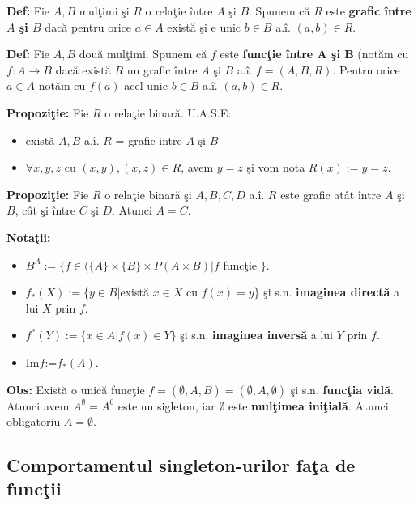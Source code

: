 \documentclass{article}
\begin{document}
\textbf{Def:} Fie $A,B$ mul\c timi \c si $R$ o rela\c tie \^ intre $A$ \c si $B$. Spunem c\u a $R$ este \textbf{grafic \^ intre $A$ \c si $B$} dac\u a pentru orice $a\in A$ exist\u a \c si e unic $b\in B$ a.\^ i. $(a,b)\in R$.

\textbf{Def:} Fie $A,B$ dou\u a mul\c timi. Spunem c\u a $f$ este \textbf{func\c tie \^ intre A \c si B} (not\u am cu $f: A \rightarrow B$ dac\u a exist\u a $R$ un grafic \^ intre $A$ \c si $B$ a.\^ i. $f=(A,B,R)$. Pentru orice $a\in A$ not\u am cu $f(a)$ acel unic $b\in B$ a.\^ i. $(a,b)\in R$.

\textbf{Propozi\c tie:} Fie $R$ o rela\c tie binar\u a. U.A.S.E:
\begin{itemize}
    \item exist\u a $A,B$ a.\^ i. $R$ = grafic intre $A$ \c si $B$
    \item $\forall x,y,z$ cu $(x,y),(x,z) \in R$, avem $y=z$ \c si vom nota $R(x):=y=z$.
\end{itemize}

\textbf{Propozi\c tie:} Fie $R$ o rela\c tie binar\u a \c si $A,B,C,D$ a.\^ i. $R$ este grafic at\^ at \^ intre $A$ \c si $B$, c\^ at \c si \^ intre $C$ \c si $D$. Atunci $A=C$.

\textbf{Nota\c tii:}
\begin{itemize}
    \item $B^A:= \{f \in (\{A\}\times \{B\}\times P(A\times B)| f$ func\c tie $\}$.
    \item $f_*(X):=\{y\in B| $exist\u a $x\in X $ cu $f(x)=y \}$ \c si s.n. \textbf{imaginea direct\u a} a lui $X$ prin $f$.
    \item $f^*(Y):= \{ x\in A| f(x)\in Y\}$ \c si s.n. \textbf{imaginea invers\u a} a lui $Y$ prin $f$.
    \item Im$f$:=$f_*(A)$.
\end{itemize}

\textbf{Obs:} Exist\u a o unic\u a func\c tie $f=(\emptyset, A,B)=(\emptyset,A,\emptyset)$ \c si s.n. \textbf{func\c tia vid\u a}. Atunci avem $A^\emptyset=A^0$ este un sigleton, iar $\emptyset$ este \textbf{mul\c timea ini\c tial\u a}. Atunci obligatoriu $A=\emptyset$.

\subsection{Comportamentul singleton-urilor fa\c ta de func\c tii}
\end{document}
